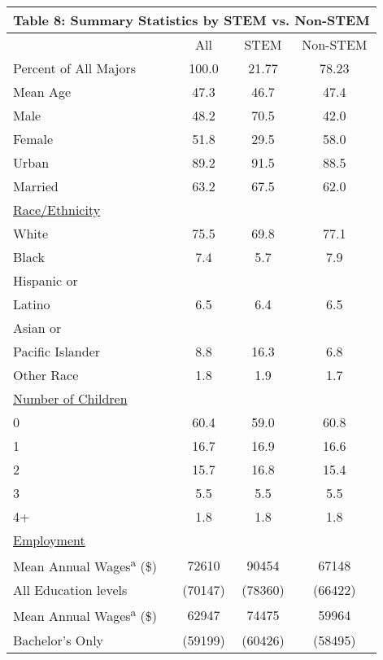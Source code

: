\documentclass[11pt]{article}
\theoremstyle{definition}
\begin{document}
\small{
\vspace{2.5mm}
\noindent
\begin{center}
\begin{tabular}{l c c c}
\hline\hline
\multicolumn{4}{c}{\textbf{Table 8: Summary Statistics by STEM vs. Non-STEM}} \\
\hline
 & All & STEM  & Non-STEM  \\
\hline
Percent of All Majors & 100.0 & 21.77 & 78.23 \\
Mean Age & 47.3 & 46.7 & 47.4  \\
Male & 48.2 & 70.5 & 42.0  \\
Female  & 51.8 & 29.5 & 58.0  \\
Urban & 89.2 & 91.5 & 88.5 \\
Married  & 63.2 & 67.5 & 62.0 \\
\underline{Race/Ethnicity}  & & &  \\
White & 75.5 & 69.8 & 77.1  \\
Black & 7.4 & 5.7 & 7.9  \\
Hispanic or & & &   \\
Latino & 6.5 & 6.4 & 6.5 \\
Asian or & & &  \\
Pacific Islander & 8.8 & 16.3 & 6.8 \\
Other Race & 1.8 & 1.9 & 1.7 \\
\underline{Number of Children} &  &  &  \\
\hspace{2.5mm}0 & 60.4 & 59.0 & 60.8 \\
\hspace{2.5mm}1 & 16.7 & 16.9 & 16.6  \\
\hspace{2.5mm}2 & 15.7 & 16.8 & 15.4  \\
\hspace{2.5mm}3 & 5.5 & 5.5 & 5.5  \\
\hspace{2.5mm}4+ & 1.8 & 1.8 & 1.8 \\
\underline{Employment} & & & \\
Mean Annual Wages\textsuperscript{a} (\$) & 72610  & 90454 & 67148  \\
\hspace{2.5mm}All Education levels & (70147) & (78360) & (66422)  \\
Mean Annual Wages\textsuperscript{a} (\$) & 62947 & 74475 & 59964  \\
\hspace{2.5mm}Bachelor's Only & (59199) & (60426) & (58495) \\

\end{tabular}
\end{center}}
\end{document}
